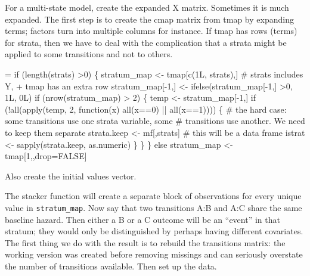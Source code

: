 \documentclass{article}
\newcommand{\code}[1]{\texttt{#1}}
\begin{document}
For a multi-state model, create the expanded X matrix.  Sometimes it is
much expanded.  
The first step is to create the cmap matrix from tmap by expanding terms;
factors turn into multiple columns for instance.  
If tmap has rows (terms) for strata, then we have to deal with the complication
that a strata might be applied to some transitions and not to others.
\begin{nwchunk}
=
 if (length(strats) >0) \{
     stratum_map <- tmap[c(1L, strats),] # strats includes Y, + tmap has an extra row
     stratum_map[-1,] <- ifelse(stratum_map[-1,] >0, 1L, 0L)
     if (nrow(stratum_map) > 2) \{
         temp <- stratum_map[-1,]
         if (!all(apply(temp, 2, function(x) all(x==0) || all(x==1)))) \{
             # the hard case: some transitions use one strata variable, some
             #  transitions use another.  We need to keep them separate
             strata.keep <- mf[,strats]  # this will be a data frame
             istrat <- sapply(strata.keep, as.numeric)
         \}
     \}
 \}
 else stratum_map <- tmap[1,,drop=FALSE]
\end{nwchunk}

Also create the initial values vector.

The stacker function will create a separate block of observations for every
unique value in \code{stratum\_map}.
Now say that two transitions A:B and A:C share the same baseline hazard. 
Then either a B or a C outcome will be an ``event'' in that stratum; they 
would only be distinguished by perhaps having different covariates.
The first thing we do with the result is to rebuild the transitions matrix:
the working version was created before removing missings and can
seriously overstate the number of transitions available.  
Then set up the data.

\end{document}
